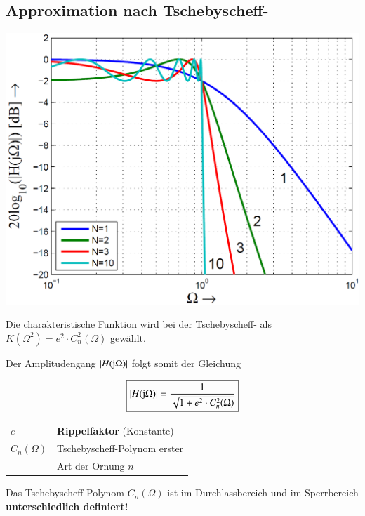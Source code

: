 \subsection{Approximation nach Tschebyscheff-}

\begin{minipage}[c]{0.45\columnwidth}
    \includegraphics[width=\columnwidth]{images/filter_tschebyscheff_amplitudengang.png}
\end{minipage}
\hfill
\begin{minipage}[c]{0.48\columnwidth}
    Die charakteristische Funktion wird bei der Tschebyscheff- als\\
    $K(\Omega^2) = e^2 \cdot C_n^2(\Omega)$ gewählt.

    Der Amplitudengang $|H(\mathrm{j} \Omega)|$ folgt somit der Gleichung

    $$\boxed{ |H(\mathrm{j} \Omega)| = \frac{1}{\sqrt{1 + e^2 \cdot C_n^2(\Omega)} } } $$

    \begin{tabular}{ll@{}}
        $e$             & \textbf{Rippelfaktor} (Konstante) \\
        $C_n(\Omega)$   & Tschebyscheff-Polynom erster\\
                        & Art der Ornung $n$
    \end{tabular}
\end{minipage}

Das Tschebyscheff-Polynom $C_n(\Omega)$ ist im Durchlassbereich und im Sperrbereich \textbf{unterschiedlich definiert!}

